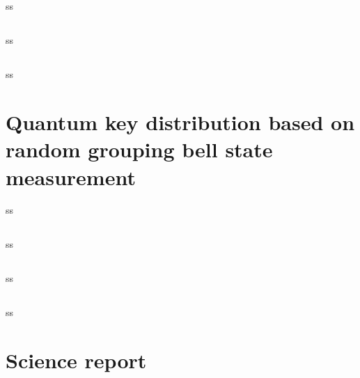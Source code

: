 \subsection*{\trnas}
ss
\subsection*{\review}
ss
\subsection*{\dic}
ss
\section{Quantum key distribution based on random grouping bell state measurement}
ss
\subsection*{\trnas}
ss
\subsection*{\review}
ss
\subsection*{\dic}
ss
\section{Science report}
\blindtext
\clearpage

